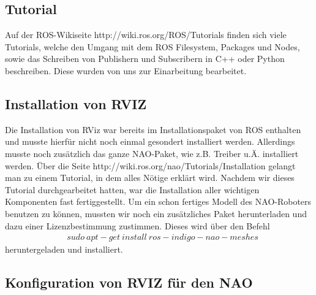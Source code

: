 \documentclass{scrartcl}
\begin{document}
\subsection{Tutorial}

Auf der ROS-Wikiseite http://wiki.ros.org/ROS/Tutorials finden sich viele Tutorials, welche den Umgang mit dem ROS Filesystem, Packages und Nodes, sowie das Schreiben von Publishern und Subscribern in C++ oder Python beschreiben.
Diese wurden von uns zur Einarbeitung bearbeitet.

\subsection{Installation von RVIZ}

Die Installation von RViz war bereits im Installationspaket von ROS enthalten und musste hierfür nicht noch einmal gesondert installiert werden. Allerdings musste noch zusätzlich das ganze NAO-Paket, wie z.B. Treiber u.Ä. installiert werden. Über die Seite http://wiki.ros.org/nao/Tutorials/Installation gelangt man zu einem Tutorial, in dem alles Nötige erklärt wird. Nachdem wir dieses Tutorial durchgearbeitet hatten, war die Installation aller wichtigen Komponenten fast fertiggestellt. Um ein schon fertiges Modell des NAO-Roboters benutzen zu können, mussten wir noch ein zusätzliches Paket herunterladen und dazu einer Lizenzbestimmung zustimmen. Dieses wird über den Befehl
\begin{align}
&sudo\ apt-get\ install\ ros-indigo-nao-meshes
\end{align}
heruntergeladen und installiert.

\subsection{Konfiguration von RVIZ für den NAO}
\end{document}
